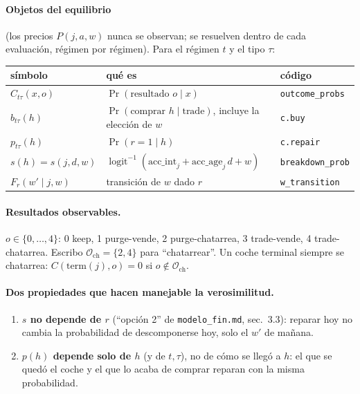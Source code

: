\documentclass[11pt]{article}
\newcommand{\code}[1]{\texttt{\small #1}}
\newcommand{\term}{\mathrm{term}}
\newcommand{\buy}{b}
\newcommand{\1}{\mathbf{1}}
\newcommand{\Osc}{\mathcal{O}_{\mathrm{ch}}}
\begin{document}
\paragraph{Objetos del equilibrio} (los precios $P(j,a,w)$ nunca se observan; se resuelven
dentro de cada evaluación, régimen por régimen). Para el régimen $t$ y el tipo $\tau$:

\begin{center}
\begin{tabular}{lll}
\toprule
símbolo & qué es & código\\
\midrule
$C_{t\tau}(x,o)$ & $\Pr(\text{resultado } o\mid x)$ & \code{outcome\_probs}\\
$\buy_{t\tau}(h)$ & $\Pr(\text{comprar } h\mid \text{trade})$, incluye la elección de $w$ & \code{c.buy}\\
$p_{t\tau}(h)$ & $\Pr(r=1\mid h)$ & \code{c.repair}\\
$s(h)=s(j,d,w)$ & $\operatorname{logit}^{-1}(\text{acc\_int}_j+\text{acc\_age}_j\, d + w)$ & \code{breakdown\_prob}\\
$F_r(w'\mid j,w)$ & transición de $w$ dado $r$ & \code{w\_transition}\\
\bottomrule
\end{tabular}
\end{center}

\paragraph{Resultados observables.} $o\in\{0,\dots,4\}$: 0 keep, 1 purge-vende,
2 purge-chatarrea, 3 trade-vende, 4 trade-chatarrea. Escribo
$\Osc=\{2,4\}$ para ``chatarrear''. Un coche terminal siempre se chatarrea:
$C(\term(j),o)=0$ si $o\notin\Osc$.

\paragraph{Dos propiedades que hacen manejable la verosimilitud.}
\begin{enumerate}[label=(P\arabic*)]
  \item \label{P1} \textbf{$s$ no depende de $r$} (``opción 2'' de \code{modelo\_fin.md},
  sec.~3.3): reparar hoy no cambia la probabilidad de descomponerse hoy, solo el $w'$ de
  mañana.
  \item \label{P2} \textbf{$p(h)$ depende solo de $h$} (y de $t,\tau$), no de cómo se llegó
  a $h$: el que se quedó el coche y el que lo acaba de comprar reparan con la misma
  probabilidad.
\end{enumerate}
\end{document}
